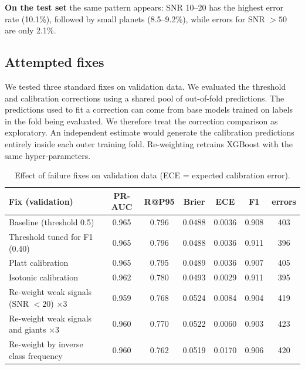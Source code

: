 \documentclass[11pt,a4paper]{article}
\begin{document}
\textbf{On the test set} the same pattern appears: SNR 10--20 has the highest error rate (10.1\%), followed by small planets (8.5--9.2\%), while errors for SNR $>50$ are only 2.1\%.

\subsection{Attempted fixes}\label{sec:fixes}
We tested three standard fixes on validation data. We evaluated the threshold and calibration corrections using a shared pool of out-of-fold predictions. The predictions used to fit a correction can come from base models trained on labels in the fold being evaluated. We therefore treat the correction comparison as exploratory. An independent estimate would generate the calibration predictions entirely inside each outer training fold. Re-weighting retrains XGBoost with the same hyper-parameters.

\begin{table}[H]\centering\footnotesize
\begin{tabular}{@{}lcccccc@{}}\toprule
Fix (validation) & PR-AUC & R@P95 & Brier & ECE & F1 & errors\\\midrule
Baseline (threshold 0.5) & 0.965 & 0.796 & 0.0488 & 0.0036 & 0.908 & 403\\
Threshold tuned for F1 (0.40) & 0.965 & 0.796 & 0.0488 & 0.0036 & 0.911 & 396\\
Platt calibration & 0.965 & 0.795 & 0.0489 & 0.0036 & 0.907 & 405\\
Isotonic calibration & 0.962 & 0.780 & 0.0493 & 0.0029 & 0.911 & 395\\
Re-weight weak signals (SNR $<20$) $\times 3$ & 0.959 & 0.768 & 0.0524 & 0.0084 & 0.904 & 419\\
Re-weight weak signals and giants $\times 3$ & 0.960 & 0.770 & 0.0522 & 0.0060 & 0.903 & 423\\
Re-weight by inverse class frequency & 0.960 & 0.762 & 0.0519 & 0.0170 & 0.906 & 420\\\bottomrule
\end{tabular}
\caption{Effect of failure fixes on validation data (ECE = expected calibration error).}\label{tab:fix}
\end{table}
\end{document}
